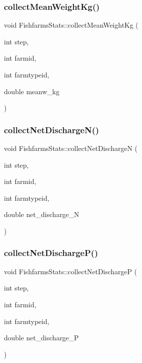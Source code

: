 \mbox{\label{class_fishfarms_stats_ac5107f039390ec5212c06f09f2e286cc}} 
\subsubsection{\texorpdfstring{collectMeanWeightKg()}{collectMeanWeightKg()}}
{\footnotesize\ttfamily void Fishfarms\+Stats\+::collect\+Mean\+Weight\+Kg (\begin{DoxyParamCaption}\item[{int}]{step,  }\item[{int}]{farmid,  }\item[{int}]{farmtypeid,  }\item[{double}]{meanw\+\_\+kg }\end{DoxyParamCaption})}

\mbox{\label{class_fishfarms_stats_a49186d02bb98aab156a08b617a39df36}} 
\subsubsection{\texorpdfstring{collectNetDischargeN()}{collectNetDischargeN()}}
{\footnotesize\ttfamily void Fishfarms\+Stats\+::collect\+Net\+DischargeN (\begin{DoxyParamCaption}\item[{int}]{step,  }\item[{int}]{farmid,  }\item[{int}]{farmtypeid,  }\item[{double}]{net\+\_\+discharge\+\_\+N }\end{DoxyParamCaption})}

\mbox{\label{class_fishfarms_stats_afa93337cba6fa9c68f167bd3877c7e96}} 
\subsubsection{\texorpdfstring{collectNetDischargeP()}{collectNetDischargeP()}}
{\footnotesize\ttfamily void Fishfarms\+Stats\+::collect\+Net\+DischargeP (\begin{DoxyParamCaption}\item[{int}]{step,  }\item[{int}]{farmid,  }\item[{int}]{farmtypeid,  }\item[{double}]{net\+\_\+discharge\+\_\+P }\end{DoxyParamCaption})}

